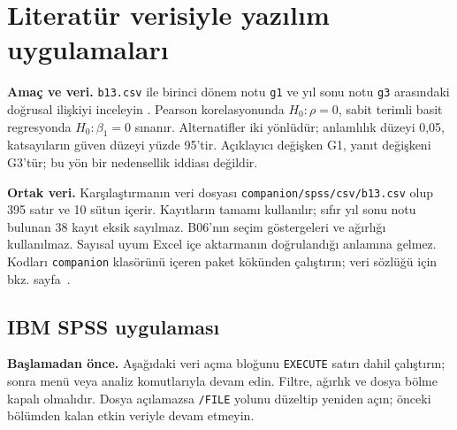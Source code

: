 \section{Literatür verisiyle yazılım uygulamaları}
\label{sec:spss-b13}

\textbf{Amaç ve veri.} \texttt{b13.csv} ile birinci dönem notu
\texttt{g1} ve yıl sonu notu \texttt{g3} arasındaki doğrusal ilişkiyi
inceleyin \citep{cortez2008data}. Pearson korelasyonunda
$H_0:\rho=0$, sabit terimli basit regresyonda $H_0:\beta_1=0$
sınanır. Alternatifler iki yönlüdür; anlamlılık düzeyi 0,05,
katsayıların güven düzeyi yüzde 95'tir. Açıklayıcı değişken G1,
yanıt değişkeni G3'tür; bu yön bir nedensellik iddiası değildir.

\textbf{Ortak veri.} Karşılaştırmanın veri dosyası
\nolinkurl{companion/spss/csv/b13.csv} olup 395 satır ve 10 sütun
içerir. Kayıtların tamamı kullanılır; sıfır yıl sonu notu bulunan
38 kayıt eksik sayılmaz. B06'nın seçim göstergeleri ve ağırlığı
kullanılmaz. Sayısal uyum Excel içe aktarmanın doğrulandığı anlamına
gelmez. Kodları \texttt{companion} klasörünü içeren paket kökünden
çalıştırın; veri sözlüğü için bkz. sayfa~\pageref{sec:spss-guide}.

\subsection{IBM SPSS uygulaması}
\textbf{Başlamadan önce.} Aşağıdaki veri açma bloğunu
\texttt{EXECUTE} satırı dahil çalıştırın; sonra menü veya analiz
komutlarıyla devam edin. Filtre, ağırlık ve dosya bölme kapalı
olmalıdır. Dosya açılamazsa \texttt{/FILE} yolunu düzeltip yeniden
açın; önceki bölümden kalan etkin veriyle devam etmeyin.

\begin{spssadimlar}
\end{spssadimlar}

